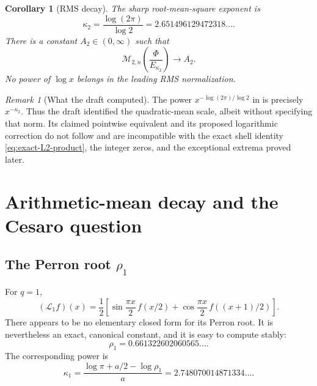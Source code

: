 \documentclass[11pt,oneside]{article}
\newtheorem{corollary}[corollary]{Corollary}
\theoremstyle{definition}
\theoremstyle{remark}
\newtheorem{remark}[remark]{Remark}
\newcommand{\Phiup}{\Phi}
\begin{document}
\begin{corollary}[RMS decay]
\label{cor:RMS-decay}
The sharp root-mean-square exponent is
\begin{equation}
 \boxed{\displaystyle
 \kappa_2=\frac{\log(2\pi)}{\log2}
 =2.651496129472318\ldots .}
 \label{eq:kappa2}
\end{equation}
There is a constant $A_2\in(0,\infty)$ such that
\begin{equation}
 \mathcal M_{2,n}\!\left(\frac{\Phiup}{E_{\kappa_2}}\right)
 \longrightarrow A_2.
 \label{eq:RMS-limit}
\end{equation}
No power of $\log x$ belongs in the leading RMS normalization.
\end{corollary}

\begin{remark}[What the draft computed]
The power $x^{-\log(2\pi)/\log2}$ in \cite{decay-draft} is precisely
$x^{-\kappa_2}$.  Thus the draft identified the quadratic-mean scale, albeit without
specifying that norm.  Its claimed pointwise equivalent and its proposed logarithmic
correction do not follow and are incompatible with the exact shell identity
\eqref{eq:exact-L2-product}, the integer zeros, and the exceptional extrema proved later.
\end{remark}

\section{Arithmetic-mean decay and the Cesaro question}
\label{sec:L1-Cesaro}

\subsection{The Perron root \texorpdfstring{$\rho_1$}{rho1}}

For $q=1$,
\begin{equation}
 (\mathcal L_1f)(x)
 =\frac12\left[
  \sin\frac{\pi x}{2}\,f(x/2)
 +\cos\frac{\pi x}{2}\,f((x+1)/2)
 \right].
 \label{eq:L1}
\end{equation}
There appears to be no elementary closed form for its Perron root.  It is nevertheless an
exact, canonical constant, and it is easy to compute stably:
\begin{equation}
 \rho_1=0.661322602060565\ldots .
 \label{eq:rho1-numerical}
\end{equation}
The corresponding power is
\begin{equation}
 \boxed{\displaystyle
 \kappa_1
 =\frac{\log\pi+a/2-\log\rho_1}{a}
 =2.748070014871334\ldots .}
 \label{eq:kappa1}
\end{equation}
\end{document}
